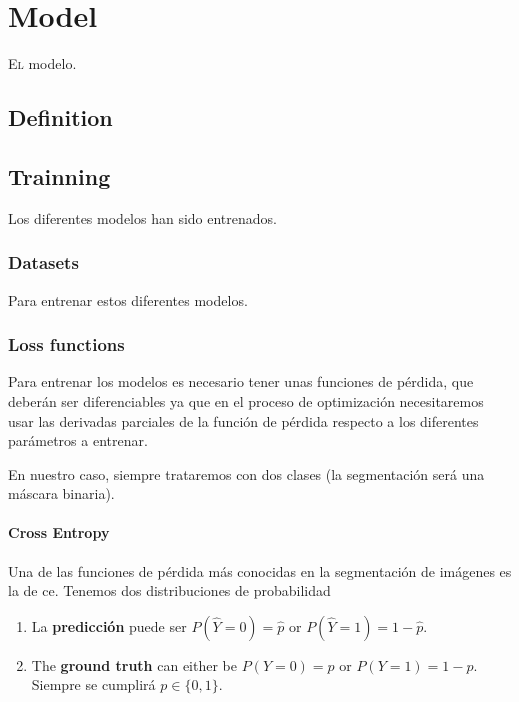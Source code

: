 

\chapter{Model}



\lettrine{E}{l} modelo.


\section{Definition}


\section{Trainning}

Los diferentes modelos han sido entrenados.

\subsection{Datasets}

Para entrenar estos diferentes modelos.

\subsection{Loss functions}

Para entrenar los modelos es necesario tener unas funciones de pérdida, que
deberán ser diferenciables ya que en el proceso de optimización necesitaremos
usar las derivadas parciales de la función de pérdida respecto a los diferentes
parámetros a entrenar.

En nuestro caso, siempre trataremos con dos clases (la segmentación será una
máscara binaria).

\subsubsection{Cross Entropy}
Una de las funciones de pérdida más conocidas en la segmentación de imágenes es
la de \gls{ce}. Tenemos dos distribuciones de probabilidad

\begin{enumerate}
  \item La \textbf{predicción} puede ser \(P(\hat{Y} = 0) = \hat{p}\) or
  \(P(\hat{Y} = 1) = 1 - \hat{p}\).
  \item The \textbf{ground truth} can either be \(P(Y = 0) = p\) or
  \(P(Y = 1) = 1 - p\). Siempre se cumplirá \(p \in \{0, 1\}\).
\end{enumerate}


